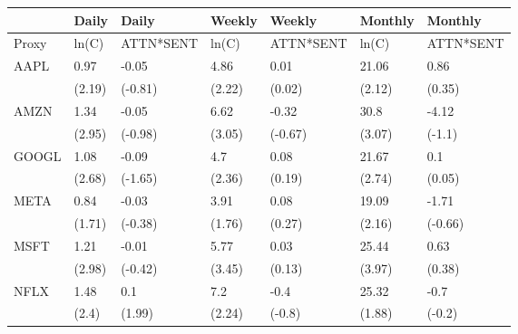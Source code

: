 \begin{tabular}{lllllll}
\toprule
{} &   Daily &      Daily &  Weekly &     Weekly & Monthly &    Monthly \\
\midrule
Proxy &   ln(C) &  ATTN*SENT &   ln(C) &  ATTN*SENT &   ln(C) &  ATTN*SENT \\
AAPL  &    0.97 &      -0.05 &    4.86 &       0.01 &   21.06 &       0.86 \\
      &  (2.19) &    (-0.81) &  (2.22) &     (0.02) &  (2.12) &     (0.35) \\
AMZN  &    1.34 &      -0.05 &    6.62 &      -0.32 &    30.8 &      -4.12 \\
      &  (2.95) &    (-0.98) &  (3.05) &    (-0.67) &  (3.07) &     (-1.1) \\
GOOGL &    1.08 &      -0.09 &     4.7 &       0.08 &   21.67 &        0.1 \\
      &  (2.68) &    (-1.65) &  (2.36) &     (0.19) &  (2.74) &     (0.05) \\
META  &    0.84 &      -0.03 &    3.91 &       0.08 &   19.09 &      -1.71 \\
      &  (1.71) &    (-0.38) &  (1.76) &     (0.27) &  (2.16) &    (-0.66) \\
MSFT  &    1.21 &      -0.01 &    5.77 &       0.03 &   25.44 &       0.63 \\
      &  (2.98) &    (-0.42) &  (3.45) &     (0.13) &  (3.97) &     (0.38) \\
NFLX  &    1.48 &        0.1 &     7.2 &       -0.4 &   25.32 &       -0.7 \\
      &   (2.4) &     (1.99) &  (2.24) &     (-0.8) &  (1.88) &     (-0.2) \\
\bottomrule
\end{tabular}
